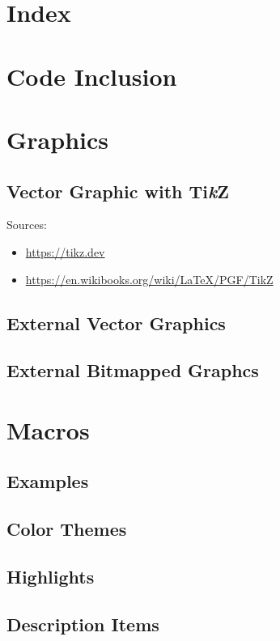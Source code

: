 \section{Index}

\section{Code Inclusion}

\section{Graphics}
\subsection{Vector Graphic with Ti\textit{k}Z}

Sources:
\begin{itemize}
  \item \url{https://tikz.dev}
  \item \url{https://en.wikibooks.org/wiki/LaTeX/PGF/TikZ}
\end{itemize}

\subsection{External Vector Graphics}
\subsection{External Bitmapped Graphcs}

\section{Macros}


\subsection{Examples}

\subsection{Color Themes}
\subsection{Highlights}
\subsection{Description Items}


